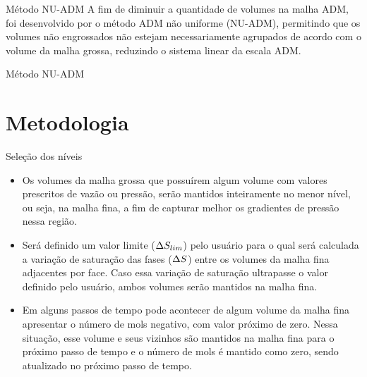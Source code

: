 \documentclass[professionalfont]{beamer}
\begin{document}
\begin{frame}{Método NU-ADM}
    A fim de diminuir a quantidade de volumes na malha ADM, foi desenvolvido por  o método ADM não uniforme (NU-ADM), permitindo que os volumes não engrossados não estejam necessariamente agrupados de acordo com o volume da malha grossa, reduzindo o sistema linear da escala ADM.


\end{frame}

\begin{frame}{Método NU-ADM}
    \begin{figure}
        \caption{Diferença entre os métodos ADM e NU-ADM}
        \begin{subfigure}{.48\textwidth}
            \centering
            \resizebox*{5cm}{!}{
            }
            \label{fig:multinivel.3.a}
        \end{subfigure}
        \begin{subfigure}{.48\textwidth}
            \centering
            \resizebox*{5cm}{!}{
            }
            \label{fig:multinivel.3.b}
        \end{subfigure}
        \label{fig:multinivel.2}
    \end{figure}

\end{frame}

\section{Metodologia}
\begin{frame}{Seleção dos níveis}
    \small
    \begin{itemize}
        \item Os volumes da malha grossa que possuírem algum volume com valores prescritos de vazão ou pressão, serão mantidos inteiramente no menor nível, ou seja, na malha fina, a fim de capturar melhor os gradientes de pressão nessa região.
        \item Será definido um valor limite ($\Delta S_{lim}$) pelo usuário para o qual será calculada a variação de saturação das fases ($\Delta S$) entre os volumes da malha fina adjacentes por face. Caso essa variação de saturação ultrapasse o valor definido pelo usuário, ambos volumes serão mantidos na malha fina.
        \item Em alguns passos de tempo pode acontecer de algum volume da malha fina apresentar o número de mols negativo, com valor próximo de zero. Nessa situação, esse volume e seus vizinhos são mantidos na malha fina para o próximo passo de tempo e o número de mols é mantido como zero, sendo atualizado no próximo passo de tempo.
    \end{itemize}
\end{frame}
\end{document}
